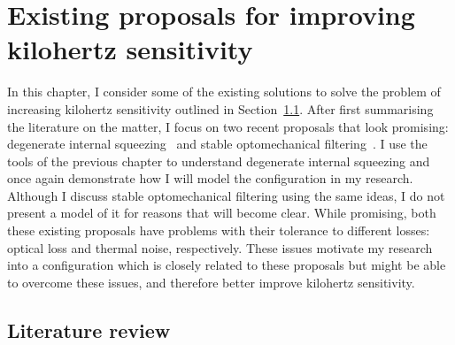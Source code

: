 \chapter{Existing proposals for improving kilohertz sensitivity} %
\label{chp:proposals}

In this chapter, I consider some of the existing solutions to solve the problem of increasing kilohertz sensitivity outlined in Section~\ref{}. After first summarising the literature on the matter, I focus on two recent proposals that look promising: degenerate internal squeezing~\cite{} and stable optomechanical filtering~\cite{}. I use the tools of the previous chapter to understand degenerate internal squeezing and once again demonstrate how I will model the configuration in my research. Although I discuss stable optomechanical filtering using the same ideas, I do not present a model of it for reasons that will become clear. 
While promising, both these existing proposals have problems with their tolerance to different losses: optical loss and thermal noise, respectively. These issues motivate my research into a configuration which is closely related to these proposals but might be able to overcome these issues, and therefore better improve kilohertz sensitivity.


\section{Literature review}


